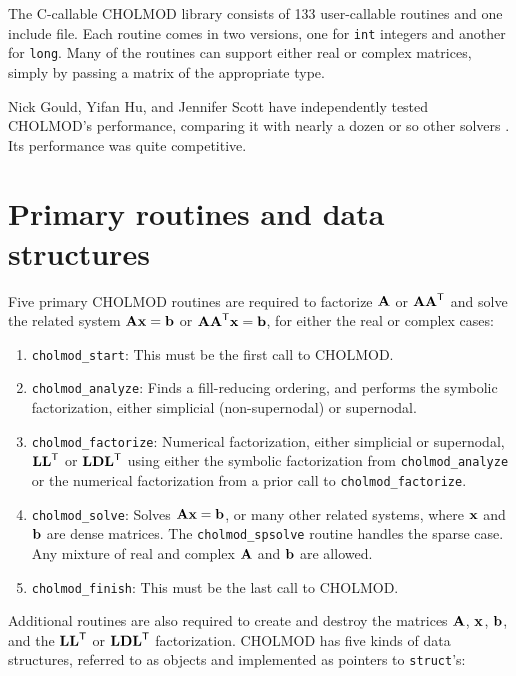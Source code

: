 \documentclass[11pt]{article}
\newcommand{\m}[1]{{\bf{#1}}}       %
\newcommand{\tr}{^{\sf T}}          %
\begin{document}
The C-callable CHOLMOD library consists of 133 user-callable routines and one
include file.  Each routine comes in two versions, one for {\tt int} integers
and another for {\tt long}.  Many of the routines can support either real or
complex matrices, simply by passing a matrix of the appropriate type.

Nick Gould, Yifan Hu, and Jennifer Scott have independently tested CHOLMOD's
performance, comparing it with nearly a dozen or so other solvers
\cite{GouldHuScott05,GouldHuScott05b}.  Its performance was quite competitive.

\newpage \section{Primary routines and data structures}

Five primary CHOLMOD routines are required to factorize $\m{A}$ or $\m{AA}\tr$
and solve the related system $\m{Ax}=\m{b}$ or $\m{AA}\tr\m{x}=\m{b}$,
for either the real or complex cases:
\begin{enumerate}
\item {\tt cholmod\_start}:
    This must be the first call to CHOLMOD.

\item {\tt cholmod\_analyze}:
    Finds a fill-reducing ordering, and performs the symbolic factorization,
    either simplicial (non-supernodal) or supernodal.

\item {\tt cholmod\_factorize}:
    Numerical factorization, either simplicial or supernodal, $\m{LL}\tr$ or $\m{LDL}\tr$
    using either the symbolic factorization from {\tt cholmod\_analyze} or the numerical
    factorization from a prior call to {\tt cholmod\_factorize}.

\item {\tt cholmod\_solve}:
    Solves $\m{Ax}=\m{b}$, or many other related systems, where $\m{x}$ and
    $\m{b}$ are dense matrices.  The {\tt cholmod\_spsolve} routine handles
    the sparse case.  Any mixture of real and complex $\m{A}$ and $\m{b}$ are
    allowed.

\item {\tt cholmod\_finish}:
    This must be the last call to CHOLMOD.
\end{enumerate}

Additional routines are also required to create and destroy
the matrices $\m{A}$, $\m{x}$, $\m{b}$, and the $\m{LL}\tr$ or $\m{LDL}\tr$ factorization.
CHOLMOD has five kinds of data structures, referred to as objects and implemented
as pointers to {\tt struct}'s:
\end{document}
